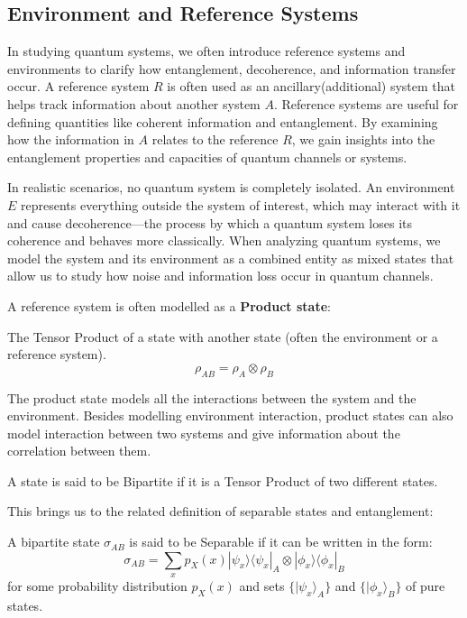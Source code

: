 \subsection{Environment and Reference Systems}

In studying quantum systems, we often introduce reference systems and environments to clarify
how entanglement, decoherence, and information transfer occur. A reference system $R$ is often
used as an ancillary(additional) system that helps track information about another system $A$.
Reference systems are useful for defining quantities like coherent information and entanglement.
By examining how the information in $A$ relates to the reference $R$, we gain insights into the
entanglement properties and capacities of quantum channels or systems.

In realistic scenarios,
no quantum system is completely isolated. An environment $E$ represents everything outside the
system of interest, which may interact with it and cause decoherence—the process by which a quantum
system loses its coherence and behaves more classically. When analyzing quantum systems, we model
the system and its environment as a combined entity as mixed states that allow us to study how
noise and information loss occur in quantum channels.

A reference system is often modelled as a \textbf{Product state}:
\begin{definition}
    The Tensor Product of a state with another state (often the environment or a reference system).
    \begin{equation}
        \rho_{AB} = \rho_A \otimes \rho_B
    \end{equation}
\end{definition}
The product state models all the interactions between the system and the environment. Besides modelling
environment interaction, product states can also model interaction between two systems and give
information about the correlation between them.
\begin{definition}
    A state is said to be Bipartite if it is a Tensor Product of two different states.
\end{definition}

This brings us to the related definition of separable states and entanglement:
\begin{definition}
    A bipartite state $\sigma_{AB}$ is said to be Separable if it can be written in the form:
    \begin{equation}
        \sigma_{AB} = \displaystyle\sum_{x} p_X(x)|\psi_x\rangle\langle\psi_x|_A \otimes |\phi_x\rangle\langle\phi_x|_B
    \end{equation}
    for some probability distribution $p_X(x)$ and sets $\{| \psi_x \rangle_A\}$ and $\{| \phi_x \rangle_B\}$ of pure states.
\end{definition}


